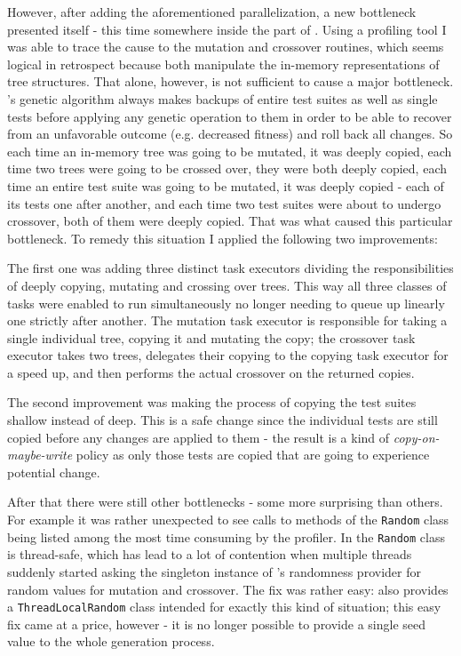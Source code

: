 However, after adding the aforementioned parallelization, a new bottleneck presented itself - this time 
somewhere inside the \java part of \xmlmate. Using a \java profiling tool I was able to trace the cause 
to the mutation and crossover routines, which seems logical in retrospect because both manipulate the 
in-memory representations of \xml tree structures. That alone, however, is not sufficient to cause a 
major bottleneck. \evosuite's genetic algorithm always makes backups of entire test suites as well as 
single tests before applying any genetic operation to them in order to be able to recover from an 
unfavorable outcome (e.g. decreased fitness) and roll back all changes. So each time an in-memory \xml 
tree was going to be mutated, it was deeply copied, each time two \xml trees were going to be crossed 
over, they were both deeply copied, each time an entire test suite was going to be mutated, it was 
deeply copied - each of its tests one after another, and each time two test suites were about to 
undergo crossover, both of them were deeply copied. That was what caused this particular bottleneck. 
To remedy this situation I applied the following two improvements:

The first one was adding three distinct task executors dividing the responsibilities of deeply copying, mutating and 
crossing over \xml trees. This way all three classes of tasks were enabled to run simultaneously 
no longer needing to queue up linearly one strictly after another. The mutation task executor is 
responsible for taking a single individual \xml tree, copying it and mutating the copy; the 
crossover task executor takes two \xml trees, delegates their copying to the copying task executor 
for a speed up, and then performs the actual crossover on the returned copies.

The second improvement was making the process of copying the test suites shallow instead of deep. 
This is a safe change since the individual tests are still copied before any changes are applied 
to them - the result is a kind of \emph{copy-on-maybe-write} policy as only those tests are copied 
that are going to experience potential change.

After that there were still other bottlenecks - some more surprising than others. For example 
it was rather unexpected to see calls to methods of the \texttt{Random} class being listed among the most time
consuming by the profiler. In  the \texttt{Random} class is thread-safe, which has lead to a lot of 
contention when multiple threads suddenly started asking the singleton instance of \evosuite's randomness 
provider for random values for mutation and crossover. The fix was rather easy:  also provides 
a \texttt{ThreadLocalRandom} class intended for exactly this kind of situation; this easy fix came 
at a price, however - it is no longer possible to provide a single seed value to the whole generation 
process.

